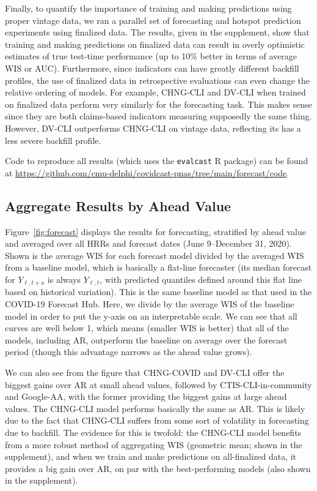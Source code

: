 \documentclass[9pt,twocolumn,twoside,lineno]{pnas-new}
\begin{document}
Finally, to quantify the importance of training and making predictions using
proper vintage data, we ran a parallel set of forecasting and hotspot prediction 
experiments using finalized data. The results, given in the supplement, show
that training and making predictions on finalized data can result in overly
optimistic estimates of true test-time performance (up to 10\% better in terms
of average WIS or AUC). Furthermore, since indicators can have greatly different
backfill profiles, the use of finalized data in retrospective evaluations can
even change the relative ordering of models.  For example, CHNG-CLI and DV-CLI
when trained on finalized data perform very similarly for the forecasting task.
This makes sense since they are both claims-based indicators measuring
supposedly the same thing.  However, DV-CLI outperforms CHNG-CLI on vintage
data, reflecting its has a less severe backfill profile.

Code to reproduce all results (which uses the \texttt{evalcast} R package) can 
be found at
\url{https://github.com/cmu-delphi/covidcast-pnas/tree/main/forecast/code}. 

\subsection{Aggregate Results by Ahead Value}

Figure~\ref{fig:forecast} displays the results for forecasting, stratified by
ahead value and averaged over all HRRs and forecast dates (June 9--December 31,
2020).  Shown is the average WIS for each forecast model divided by the averaged
WIS from a baseline model, which is basically a flat-line forecaster (its
median forecast for $Y_{\ell,t+a}$ is always $Y_{\ell,t}$, with predicted
quantiles defined around this flat line based on historical variation). This is
the same baseline model as that used in the COVID-19 Forecast Hub.  Here, we  
divide by the average WIS of the baseline model in order to put the y-axis on an 
interpretable scale.  We can see that all curves are well below 1, which means
(smaller WIS is better) that all of the models, including AR, outperform the
baseline on average over the forecast period (though this advantage narrows as
the ahead value grows).      

We can also see from the figure that CHNG-COVID and DV-CLI offer the biggest
gains over AR at small ahead values, followed by CTIS-CLI-in-community and
Google-AA, with the former providing the biggest gains at large ahead values.
The CHNG-CLI model performs basically the same as AR.  This is likely due to the
fact that CHNG-CLI suffers from some sort of volatility in forecasting due to
backfill.  The evidence for this is twofold: the CHNG-CLI model benefits from a
more robust method of aggregating WIS (geometric mean; shown in the supplement),
and when we train and make predictions on all-finalized data, it provides a big
gain over AR, on par with the best-performing models (also shown in the
supplement).
\end{document}
